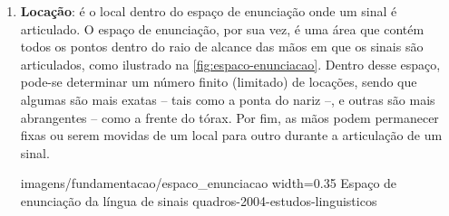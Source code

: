 \begin{enumerate}

    \item \textbf{Locação}: é o local dentro do espaço de enunciação onde um sinal é articulado. O espaço de enunciação, por sua vez, é uma área que contém todos os pontos dentro do raio de alcance das mãos em que os sinais são articulados, como ilustrado na \autoref{fig:espaco-enunciacao}. Dentro desse espaço, pode-se determinar um número finito (limitado) de locações, sendo que algumas são mais exatas -- tais como a ponta do nariz --, e outras são mais abrangentes -- como a frente do tórax. Por fim, as mãos podem permanecer fixas ou serem movidas de um local para outro durante a articulação de um sinal.
    
        {imagens/fundamentacao/espaco_enunciacao} %
        {width=0.35\linewidth} %
        {Espaço de enunciação da língua de sinais} %
        {quadros-2004-estudos-linguisticos} %







\end{enumerate}
